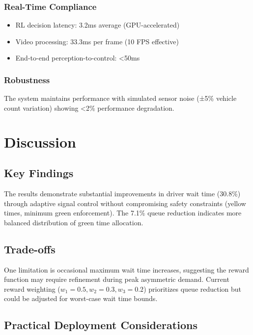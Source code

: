 \documentclass[10pt,conference]{IEEEtran}
\begin{document}
\subsubsection{Real-Time Compliance}
\begin{itemize}
    \item RL decision latency: 3.2ms average (GPU-accelerated)
    \item Video processing: 33.3ms per frame (10 FPS effective)
    \item End-to-end perception-to-control: <50ms
\end{itemize}

\subsubsection{Robustness}
The system maintains performance with simulated sensor noise (±5\% vehicle count variation) showing <2\% performance degradation.

\section{Discussion}

\subsection{Key Findings}

The results demonstrate substantial improvements in driver wait time (30.8\%) through adaptive signal control without compromising safety constraints (yellow times, minimum green enforcement). The 7.1\% queue reduction indicates more balanced distribution of green time allocation.

\subsection{Trade-offs}

One limitation is occasional maximum wait time increases, suggesting the reward function may require refinement during peak asymmetric demand. Current reward weighting ($w_1=0.5, w_2=0.3, w_3=0.2$) prioritizes queue reduction but could be adjusted for worst-case wait time bounds.

\subsection{Practical Deployment Considerations}
\end{document}

